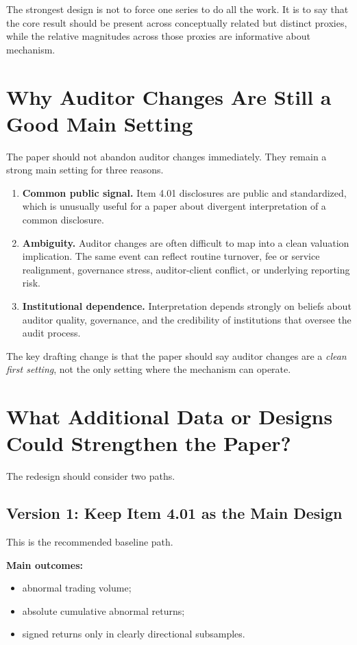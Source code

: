 \documentclass[12pt]{article}
\begin{document}
The strongest design is not to force one series to do all the work. It is to say that the core result should be present across conceptually related but distinct proxies, while the relative magnitudes across those proxies are informative about mechanism.

\section{Why Auditor Changes Are Still a Good Main Setting}

The paper should not abandon auditor changes immediately. They remain a strong main setting for three reasons.

\begin{enumerate}[label=\textbf{A\arabic*.}]
    \item \textbf{Common public signal.} Item 4.01 disclosures are public and standardized, which is unusually useful for a paper about divergent interpretation of a common disclosure.
    \item \textbf{Ambiguity.} Auditor changes are often difficult to map into a clean valuation implication. The same event can reflect routine turnover, fee or service realignment, governance stress, auditor-client conflict, or underlying reporting risk.
    \item \textbf{Institutional dependence.} Interpretation depends strongly on beliefs about auditor quality, governance, and the credibility of institutions that oversee the audit process.
\end{enumerate}

The key drafting change is that the paper should say auditor changes are a \emph{clean first setting}, not the only setting where the mechanism can operate.

\section{What Additional Data or Designs Could Strengthen the Paper?}

The redesign should consider two paths.

\subsection{Version 1: Keep Item 4.01 as the Main Design}

This is the recommended baseline path.

\textbf{Main outcomes:}
\begin{itemize}
    \item abnormal trading volume;
    \item absolute cumulative abnormal returns;
    \item signed returns only in clearly directional subsamples.
\end{itemize}
\end{document}
